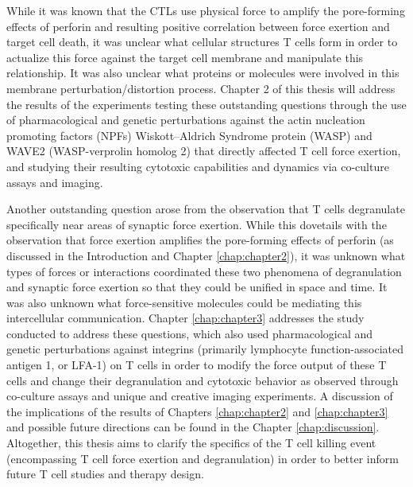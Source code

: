 While it was known that the CTLs use physical force to amplify the pore-forming effects of perforin and resulting positive correlation between force exertion and  target cell death, it was unclear what cellular structures T cells form in order to actualize this force against the target cell membrane and manipulate this relationship. It was also unclear what proteins or molecules were involved in this membrane perturbation/distortion process. Chapter 2 of this thesis will address the results of the experiments testing these outstanding questions through the use of pharmacological and genetic perturbations against the actin nucleation promoting factors (NPFs) Wiskott–Aldrich Syndrome protein (WASP) and WAVE2 (WASP-verprolin homolog 2) that directly affected T cell force exertion, and studying their resulting cytotoxic capabilities and dynamics via co-culture assays and imaging.

Another outstanding question arose from the observation that T cells degranulate specifically near areas of synaptic force exertion. While this dovetails with the observation that force exertion amplifies the pore-forming effects of perforin (as discussed in the Introduction and Chapter \ref{chap:chapter2}), it was unknown what types of forces or interactions coordinated these two phenomena of degranulation and synaptic force exertion so that they could be unified in space and time. It was also unknown what force-sensitive molecules could be mediating this intercellular communication. Chapter \ref{chap:chapter3} addresses the study conducted to address these questions, which also used pharmacological and genetic perturbations against integrins (primarily lymphocyte function-associated antigen 1, or LFA-1) on T cells in order to modify the force output of these T cells and change their degranulation and cytotoxic behavior as observed through co-culture assays and unique and creative imaging experiments. A discussion of the implications of the results of Chapters \ref{chap:chapter2} and \ref{chap:chapter3} and possible future directions can be found in the Chapter \ref{chap:discussion}. Altogether, this thesis aims to clarify the specifics of the T cell killing event (encompassing T cell force exertion and degranulation) in order to better inform future T cell studies and therapy design. 
